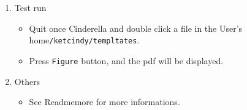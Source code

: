 \documentclass{article}
\begin{document}
\begin{enumerate}[\bf\large 1.]
\vspace{72mm}

\item Test run
\begin{itemize}
\item Quit once Cinderella and double click a file in the User's home\verb|/ketcindy/templtates|.
\item Press \verb|Figure| button, and the pdf will be displayed.
\end{itemize}

\item Others
\begin{itemize}
\item See Readmemore for more informations.
\end{itemize}

  \end{enumerate}
\end{document}
